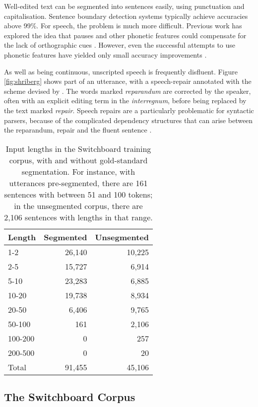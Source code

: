 \documentclass[11pt,letterpaper]{article}
\begin{document}
Well-edited text can be segmented into sentences easily, using punctuation and
capitalisation.  Sentence boundary detection systems typically achieve accuracies
above 99\%.  For speech, the problem is much more difficult.  Previous work has
explored the idea that pauses and other phonetic features could compensate
for the lack of orthographic cues \citep{mischa:??}.  However, even the
successful attempts to use phonetic features have yielded only small accuracy
improvements \citep{isi}.

As well as being continuous, unscripted speech is frequently disfluent.
Figure \ref{fig:shriberg} shows part of an utterance, with a speech-repair annotated
with the scheme devised by \citet{shriberg:94}.  The words marked \emph{reparandum}
are corrected by the speaker, often with an explicit editing term in the
\emph{interregnum}, before being replaced by the text marked \emph{repair}.
Speech repairs are a particularly problematic for syntactic
parsers, because of the complicated dependency structures that can arise between the
reparandum, repair and the fluent sentence \citep{johnson:05}.

\begin{table}
\centering
\small
\begin{tabular}{l|rr}
    \hline
    Length & Segmented & Unsegmented \\
    \hline \hline
    1-2 & 26,140 & 10,225 \\
    2-5 & 15,727 & 6,914 \\
    5-10 & 23,283 & 6,885 \\
    10-20 & 19,738 &  8,934 \\
    20-50 & 6,406 & 9,765 \\
    50-100 & 161 & 2,106 \\
    100-200 & 0 & 257 \\
    200-500 & 0 & 20 \\
    \hline
    Total & 91,455 & 45,106 \\
    \hline
\end{tabular}
\caption{\small Input lengths in the Switchboard training corpus, with and without
    gold-standard segmentation.  For instance, with utterances pre-segmented,
    there are 161 sentences with between 51 and 100 tokens; in the unsegmented
corpus, there are 2,106 sentences with lengths in that range.
\label{tab:seg_freqs}}
\vspace*{-3em}
\end{table}

\subsection{The Switchboard Corpus}
\end{document}
